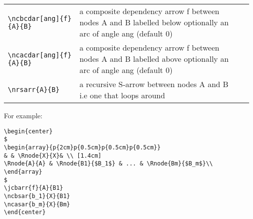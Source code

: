 \documentclass[10pt,a4paper]{article}
\begin{document}
\begin{tabular}{|l |  p{5cm} | c |}
			&
			\raisebox{-0.75cm}{$
\begin{array} {c}
\Rnode{A}{A} \\ [0.75cm]
\Rnode{B}{B}
\end{array}$\nccdar{A}{B}} \\
		 	 \hline			
		 	 \verb!\ncbcdar[ang]{f}{A}{B}! & a composite dependency arrow f between nodes A and B labelled below optionally an arc of angle ang (default 0)
			&
			\raisebox{-0.75cm}{$
\begin{array} {c}
\Rnode{A}{A} \\ [0.75cm]
\Rnode{B}{B}
\end{array}$\ncbcdar{f}{A}{B}}
			\\
			\hline
		 	 \verb!\ncacdar[ang]{f}{A}{B}! & a composite dependency arrow f between nodes A and B labelled above optionally an arc of angle ang (default 0)
						&
			\raisebox{-0.75cm}{$
\begin{array} {c}
\Rnode{A}{A} \\ [0.75cm]
\Rnode{B}{B}
\end{array}$\ncacdar{f}{A}{B}}
			\\
		 	 \hline	   
		   \verb!\nrsarr{A}{B}! &  a recursive S-arrow between nodes A and B i.e one that loops around
			&
			\\ 
			\hline		
		\end{tabular}
\vspace{0.5cm}

\noindent For example:
\begin{verbatim}
\begin{center}
$
\begin{array}{p{2cm}p{0.5cm}p{0.5cm}p{0.5cm}}
& & \Rnode{X}{X}& \\ [1.4cm]
\Rnode{A}{A} & \Rnode{B1}{$B_1$} & ... & \Rnode{Bm}{$B_m$}\\
\end{array}
$
\jcbarr{f}{A}{B1}
\ncbsar{b_1}{X}{B1}
\ncasar{b_m}{X}{Bm}
\end{center}
\end{verbatim}
\end{document}

